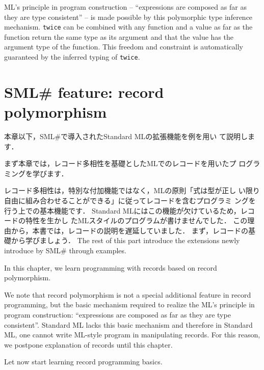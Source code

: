 \documentclass{jbook}
\newcommand{\txt}[2]{#2}
\newcommand{\smlsharp}{SML\#}
\begin{document}
	ML's principle in program construction -- ``expressions are
composed as far as they are type consistent'' -- is made possible by
this polymorphic type inference mechanism.
	{\tt twice} can be combined with any function and a value as far
as the function return the same type as its argument and that the value
has the argument type of the function.
	This freedom and constraint is automatically guaranteed by the
inferred typing of {\tt twice}.

\chapter{
\txt{\smlsharp{}の拡張機能：レコード多相性}
    {\smlsharp{} feature: record polymorphism}
}
\label{chap:tutorialRecordpolymorphism}

\ifx\jp%
	本章以下，\smlsharp{}で導入されたStandard MLの拡張機能を例を用い
て説明します．

	まず本章では，レコード多相性を基礎としたMLでのレコードを用いたプ
ログラミングを学びます．

	レコード多相性は，特別な付加機能ではなく，MLの原則「式は型が正し
い限り自由に組み合わせることができる」に従ってレコードを含むプログラミ
ングを行う上での基本機能です．
	Standard MLにはこの機能が欠けているため，レコードの特性を生かし
たMLスタイルのプログラムが書けませんでした．
	この理由から，本書では，レコードの説明を遅延していました．
	まず，レコードの基礎から学びましょう．
\else%
	The rest of this part introduce the extensions newly introduce
by \smlsharp{} through examples.

	In this chapter, we learn programming with records based on 
record polymorphism.

	We note that record polymorphism is not a special additional
feature in record programming, but the basic mechanism required to
realize the ML's principle in program construction: ``expressions are
composed as far as they are type consistent''.
	Standard ML lacks this basic mechanism and therefore in Standard
ML, one cannot write ML-style program in manipulating records.
	For this reason, we postpone explanation of records until this
chapter.

	Let now start learning record programming basics.
\fi%
\end{document}
